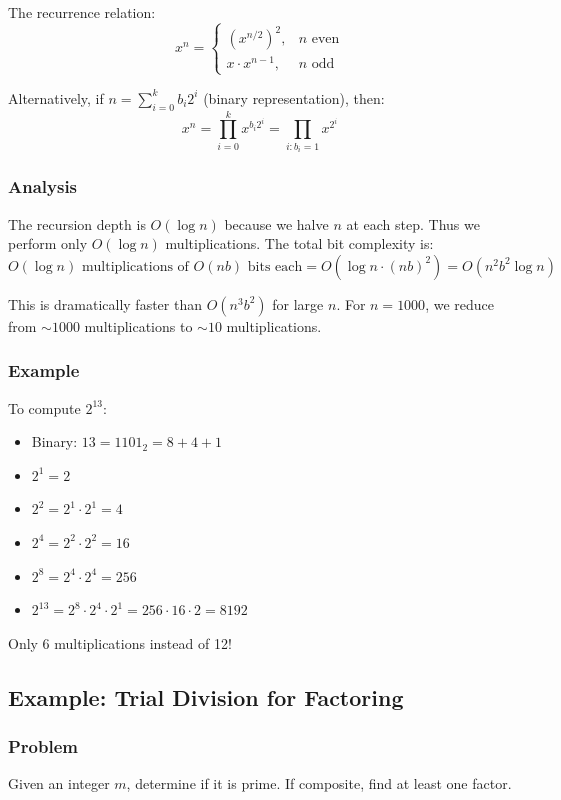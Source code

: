 \documentclass[11pt]{article}
\begin{document}
The recurrence relation:
\[
x^n = \begin{cases}
\left(x^{n/2}\right)^2, & n \text{ even} \\
x \cdot x^{n-1}, & n \text{ odd}
\end{cases}
\]

Alternatively, if $n = \sum_{i=0}^{k} b_i 2^i$ (binary representation), then:
\[
x^n = \prod_{i=0}^{k} x^{b_i 2^i} = \prod_{i: b_i = 1} x^{2^i}
\]

\subsubsection*{Analysis}
The recursion depth is $O(\log n)$ because we halve $n$ at each step. Thus we perform only $O(\log n)$ multiplications. The total bit complexity is:
\[
O(\log n) \text{ multiplications of } O(nb) \text{ bits each} = O(\log n \cdot (nb)^2) = O(n^2 b^2 \log n)
\]

This is dramatically faster than $O(n^3 b^2)$ for large $n$. For $n=1000$, we reduce from $\sim 1000$ multiplications to $\sim 10$ multiplications.

\subsubsection*{Example}
To compute $2^{13}$:
\begin{itemize}
\item Binary: $13 = 1101_2 = 8 + 4 + 1$
\item $2^1 = 2$
\item $2^2 = 2^1 \cdot 2^1 = 4$
\item $2^4 = 2^2 \cdot 2^2 = 16$
\item $2^8 = 2^4 \cdot 2^4 = 256$
\item $2^{13} = 2^8 \cdot 2^4 \cdot 2^1 = 256 \cdot 16 \cdot 2 = 8192$
\end{itemize}

Only 6 multiplications instead of 12!

\subsection*{Example: Trial Division for Factoring}

\subsubsection*{Problem}
Given an integer $m$, determine if it is prime. If composite, find at least one factor.
\end{document}
